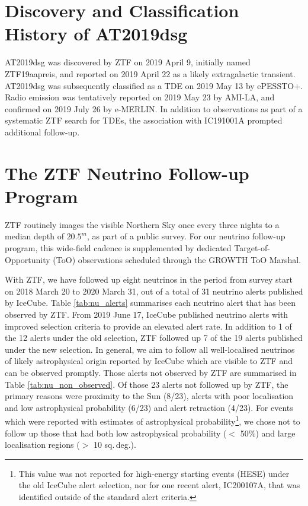 \documentclass{nature_plusfigure}
\begin{document}
\clearpage
\newpage

\begin{methods}
\renewcommand{\thefigure}{S\arabic{figure}}
\renewcommand{\thetable}{S\arabic{table}}
\setcounter{figure}{0}

\section{Discovery and Classification History of AT2019dsg}
AT2019dsg was discovered by ZTF on 2019 April 9, initially named ZTF19aapreis, and reported on 2019 April 22 as a likely extragalactic transient\cite{2019TNSTR.615....1N}. AT2019dsg was subsequently classified as a TDE on 2019 May 13 by ePESSTO+\cite{2019ATel12752....1N}. Radio emission was tentatively reported on 2019 May 23 by AMI-LA\cite{2019ATel12798....1S}, and confirmed on 2019 July 26 by e-MERLIN\cite{2019ATel12960....1P}. In addition to observations as part of a systematic ZTF search for TDEs\cite{2020arXiv200101409V}, the association with IC191001A prompted additional follow-up. 

\section{The ZTF Neutrino Follow-up Program}
ZTF routinely images the visible Northern Sky once every three nights to a median depth of $20.5^{m}$, as part of a public survey\cite{2019PASP..131a8002B, 2019PASP..131g8001G}. For our neutrino follow-up program, this wide-field cadence is supplemented by dedicated Target-of-Opportunity (ToO) observations scheduled through the GROWTH ToO Marshal\cite{2019PASP..131d8001C}. 

With ZTF, we have followed up eight neutrinos in the period from survey start on 2018 March 20 to 2020 March 31, out of a total of 31 neutrino alerts published by IceCube. Table \ref{tab:nu_alerts} summarises each neutrino alert that has been observed by ZTF. From 2019 June 17, IceCube published neutrino alerts with improved selection criteria to provide an elevated alert rate\cite{2019ICRC...36.1021B}. In addition to 1 of the 12 alerts under the old selection, ZTF  followed up 7 of the 19 alerts published under the new selection. In general, we aim to follow all well-localised neutrinos of likely astrophysical origin reported by IceCube which are visible to ZTF and can be observed promptly. Those alerts not observed by ZTF are summarised in Table \ref{tab:nu_non_observed}. Of those 23 alerts not followed up by ZTF, the primary reasons were proximity to the Sun (8/23), alerts with poor localisation and low astrophysical probability (6/23) and alert retraction (4/23). For events which were reported with estimates of astrophysical probability\footnote{This value was not reported for high-energy starting events (HESE) under the old IceCube alert selection, nor for one recent alert, IC200107A, that was identified outside of the standard alert criteria\cite{stein:gcn26655}.}, we chose not to follow up those that had both low astrophysical probability ($<$ 50\%) and large localisation regions ($>$ 10 sq.\,deg.).


\end{methods}
\end{document}

